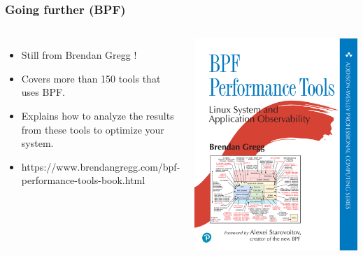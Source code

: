 \begin{frame}[fragile]
  \frametitle{Going further (BPF)}
  \begin{columns}
    \begin{itemize}
    \item Still from Brendan Gregg !
    \item Covers more than 150 tools that uses BPF.
    \item Explains how to analyze the results from these tools to optimize
      your system.
    \item https://www.brendangregg.com/bpf-performance-tools-book.html
    \end{itemize}
    \includegraphics[height=0.6\textheight]{slides/debugging-system-wide-profiling/bpfperftools_bookcover.png}\\ 
  \end{columns}
\end{frame}